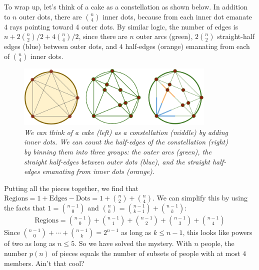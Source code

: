 \documentclass{article}
\begin{document}
            To wrap up, let's think of a cake as a constellation as shown
            below.  In addition to $n$ outer dots, there are ${n \choose 4}$
            inner dots, because from each inner dot emanate $4$ rays pointing
            toward $4$ outer dots.  By similar logic, the number of edges is $n
            + 2{n\choose 2}/2 + 4{n \choose 4}/2$, since there are $n$ outer
            arcs (green), $2{n\choose 2}$ straight-half edges (blue) between
            outer dots, and $4$ half-edges (orange) emanating from each of
            ${n\choose 4}$ inner dots.
            \begin{figure}[h!]
                \centering
                \includegraphics[height=3cm]{count}
                \caption{\emph{
                    We can think of a cake (left)
                    as a constellation (middle) by adding inner dots.
                    We can count the half-edges of the constellation (right) 
                    by binning them into three groups: the outer arcs (green),
                    the straight half-edges between outer dots (blue), and the
                    straight half-edges emanating from inner dots (orange).
                }}
            \end{figure}

            Putting all the pieces together, we find that
            $
                \text{Regions} = 1 + \text{Edges} - \text{Dots}
                               = 1 + {n\choose 2} + {n\choose 4}
            $.  We can simplify this by using the facts that $1={n-1 \choose
            0}$ and ${n \choose k} = {n-1 \choose k-1} + {n-1 \choose k}$:
            \begin{align*}
                \text{Regions}
                              = {n-1 \choose 0}
                              + {n-1 \choose 1}
                              + {n-1 \choose 2}
                              + {n-1 \choose 3}
                              + {n-1 \choose 4}
            \end{align*}
            Since ${n-1\choose 0} + \cdots + {n-1\choose k} = 2^{n-1}$ as long
            as $k\leq n-1$, this looks like powers of two as long as $n\leq 5$.  
            So we have solved the mystery.  With $n$ people, the number $p(n)$
            of pieces equals the number of subsets of people with at most $4$
            members.  Ain't that cool?  
 
\end{document}
